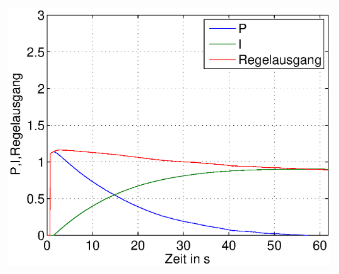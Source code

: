\begin{frame}
\begin{columns}[c]
\begin{figure}[H]
\begin{center}
        \end{center}
        \end{figure}
        \begin{figure}[H]
        \begin{center}
                \includegraphics[scale=0.3]{./img/plots/2d_kb_0_1_t_200_aus.eps}
        \end{center}
        \end{figure}
    \end{columns}
\end{frame}
